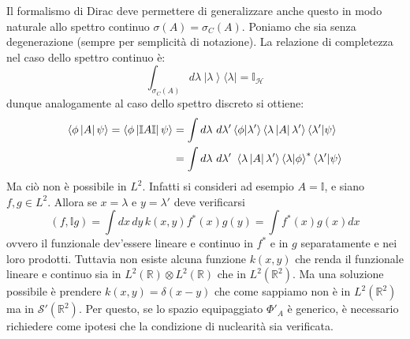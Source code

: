 \documentclass[../../FisicaTeorica.tex]{subfiles}
\begin{document}
\begin{enumerate}
	Il formalismo di Dirac deve permettere di generalizzare anche questo in modo naturale allo spettro continuo $\sigma \left(A\right)= \sigma_C\left(A\right)$. Poniamo che sia senza degenerazione (sempre per semplicità di notazione).
	La relazione di completezza nel caso dello spettro continuo è:
	\[
	\int_{\sigma_C\left(A\right)}{d\lambda\ \left|\lambda\right\rangle\langle\lambda|}=\mathbb{I}_\mathcal{H}
	\]
	dunque analogamente al caso dello spettro discreto si ottiene:
	\begin{align}
	\left\langle\phi\left|A\right|\psi\right\rangle=\left\langle\phi\left|\mathbb{I}A\mathbb{I}\right|\psi\right\rangle&=\int d\lambda \  d\lambda'\left\langle\phi\middle|\lambda'\right\rangle\left\langle\lambda\left|A\right|\lambda'\right\rangle\left\langle\lambda'\middle|\psi\right\rangle \notag \\
	& =\int d\lambda \ d\lambda' \ \left\langle\lambda\left|A\right|\lambda'\right\rangle\left\langle\lambda|\phi\right\rangle^\ast\left\langle\lambda'\middle|\psi\right\rangle \notag
	\end{align}
	Ma ciò non è possibile in $L^2$. Infatti si consideri ad esempio $A=\mathbb I$, e siano $f,g\in L^2$. Allora se $x = \lambda$ e $y = \lambda'$ deve verificarsi
	\[
	\left(f,\mathbb{I}g\right)=\int dx \, dy \, k\left(x,y\right)f^\ast\left(x\right)g\left(y\right)
	=\int f^\ast\left(x\right) g\left(x\right)dx
	\] ovvero il funzionale dev'essere lineare e continuo in $f^\ast$ e in $g$ separatamente e nei loro prodotti. Tuttavia non esiste alcuna funzione $k\left(x,y\right)$ che renda il funzionale lineare e continuo sia in $L^2\left(\mathbb{R}\right)\otimes L^2\left(\mathbb{R}\right)$ che in $L^2(\mathbb{R}^2)$.
	Ma una soluzione possibile è prendere $k\left(x,y\right)=\delta \left(x-y\right)$ che come sappiamo non è in $L^2\left(\mathbb{R}^2\right)$
	ma in $\mathcal{S}'\left(\mathbb{R}^2\right)$. Per questo, se lo spazio equipaggiato $\Phi'_A$ è generico, è necessario richiedere come ipotesi che la condizione di nuclearità sia verificata.
\end{enumerate}
\end{document}
